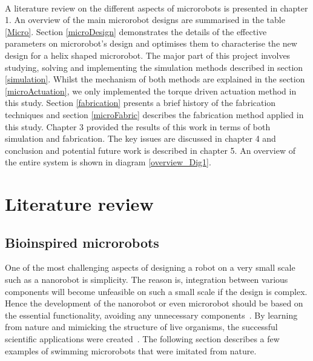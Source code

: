 \documentclass[12pt,a4paper,titlepage]{report}
\begin{document}
\paragraph{}


A literature review on the different aspects of microrobots is presented in chapter 1.
An overview of the main microrobot designs are summarised in the table \ref{Micro}.  
Section \ref{microDesign} demonstrates the details of the effective parameters on 
microrobot\rq{}s design and optimises them to characterise the new design for 
a helix shaped microrobot. The major part of this project involves studying, solving and 
implementing the simulation methods
 described in section \ref{simulation}.  
Whilst the mechanism of both methods are explained in the section \ref{microActuation}, we
only implemented the torque driven actuation method in this study. 
Section \ref{fabrication} presents a brief history of the fabrication techniques and section \ref{microFabric}
 describes the fabrication method applied in this study. Chapter 3 provided the results of this work in terms of both
simulation and fabrication. The key issues are discussed in chapter 4 and conclusion and potential
future work is described in chapter 5. An overview of the entire system is shown in diagram \ref{overview_Dig1}.
















\section{Literature review}
 


\subsection{Bioinspired microrobots}

One of the most challenging aspects of designing a robot on a very small scale such 
as a nanorobot is simplicity. The reason is, integration between various components
will become unfeasible on such a small
 scale if the design is complex. Hence the development of the nanorobot or even microrobot
 should be based on the essential functionality, avoiding any unnecessary components~\citep{gao2013bioinspired}.
By learning from nature and mimicking the structure of live organisms, the successful  
scientific applications were created~\citep{qiunanohelices}. The following section describes a
 few examples of swimming microrobots that were imitated from nature. 
 
\end{document}
